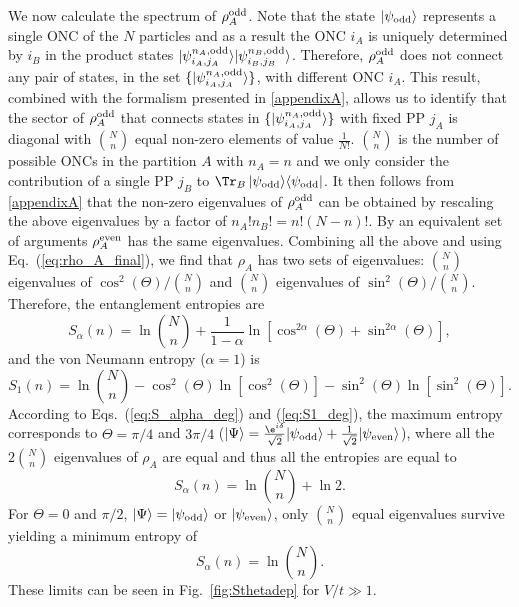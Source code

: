 We now calculate the spectrum of $\rho_A^{\rm odd}$. Note that the state $\vert
\psi_{\rm odd}\rangle$ represents a single ONC of the $N$ particles and as a
result the ONC $i_A$ is uniquely determined by $i_B$ in the product states
$\vert \psi^{n_A,\rm{odd}}_{i_A,j_A}\rangle\vert
\psi^{n_B,\rm{odd}}_{i_B,j_B}\rangle$. Therefore, $\rho_A^{\rm odd}$ does not
connect any pair of states, in the set $\{\vert
\psi^{n_A,\rm{odd}}_{i_A,j_A}\rangle\}$, with different ONC $i_A$. This result,
combined with the formalism presented in \ref{appendixA}, allows us to identify
that the sector
of $\rho_A^{\rm odd}$ that connects states in $\{\vert
\psi^{n_A,\rm{odd}}_{i_A,j_A}\rangle\}$ with
fixed PP $j_A$ is diagonal with $\binom{N}{n}$ equal non-zero elements of value
$\frac{1}{N!}$.  $\binom{N}{n}$ is the number of possible ONCs in the
partition $A$ with $n_A=n$ and we only consider the contribution of a single PP
$j_B$ to ${\Tr}_{B}\,\vert\psi_{\rm{odd}}\rangle\langle\psi_{\rm{odd}}\vert$.
It then follows from \ref{appendixA} that the non-zero eigenvalues of
$\rho_A^{\rm odd}$  can be obtained by rescaling the above eigenvalues by a factor
of $n_A!n_B!=n!(N-n)!$.  By an equivalent set of arguments 
$\rho_A^{\rm even}$ has the same eigenvalues. Combining all the above and using
Eq.~(\ref{eq:rho_A_final}), we find that $\rho_A$ has two sets of eigenvalues:
$\binom{N}{n}$ eigenvalues of $\cos^2(\Theta)/{\binom{N}{n}}$ and
$\binom{N}{n}$ eigenvalues of $\sin^2(\Theta)/{\binom{N}{n}}$. Therefore, 
the \ren entanglement entropies are
%
\begin{equation}
S_{\alpha}(n) = \ln
\binom{N}{n}+
\frac{1}{1-\alpha} \ln\left[\cos^{2\alpha}(\Theta)+\sin^{2\alpha}(\Theta)\right]
\label{eq:S_alpha_deg},
\end{equation}
%
and the von Neumann entropy ($\alpha = 1$) is
%
\begin{equation}
S_1(n) = \ln \binom{N}{n}-\cos^2(\Theta)
\ln\left[\cos^2(\Theta)\right]-\sin^2(\Theta)\ln\left[\sin^2(\Theta)\right].
\label{eq:S1_deg}
\end{equation}
%
According to Eqs.~(\ref{eq:S_alpha_deg}) and (\ref{eq:S1_deg}), the maximum
entropy corresponds to $\Theta=\pi/4$ and $3\pi/4$ ($\vert\Psi\rangle=
\frac{\e^{i\delta}}{\sqrt{2}}\vert\psi_{\rm{odd}}\rangle+\frac{1}{\sqrt{2}}\vert\psi_{\rm{even}}\rangle$),
where all the $2\binom{N}{n}$ eigenvalues of $\rho_A$ are equal and thus all
the \ren entropies are equal to
%
\begin{equation}
S_{\alpha}(n) = \ln \binom{N}{n}+\ln2.
\label{eq:rho_A_final1}
\end{equation}
%
For $\Theta=0$ and $\pi/2$,  $\vert\Psi\rangle= \vert\psi_{\rm{odd}}\rangle$ or
$\vert\psi_{\rm{even}}\rangle$, only $\binom{N}{n}$ equal eigenvalues survive
yielding a minimum entropy of
%
\begin{equation}
S_{\alpha}(n) = \ln \binom{N}{n}.
\label{eq:rho_A_final2}
\end{equation}
These limits can be seen in Fig.~\ref{fig:Sthetadep} for $V/t \gg 1$.


